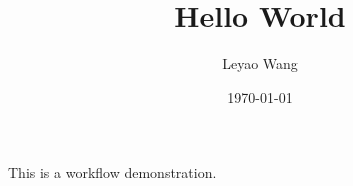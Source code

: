 \documentclass[11pt]{article}
\title{Hello World}
\author{Leyao Wang}
\date{\today}
\begin{document}
\maketitle
This is a workflow demonstration.
\end{document}
